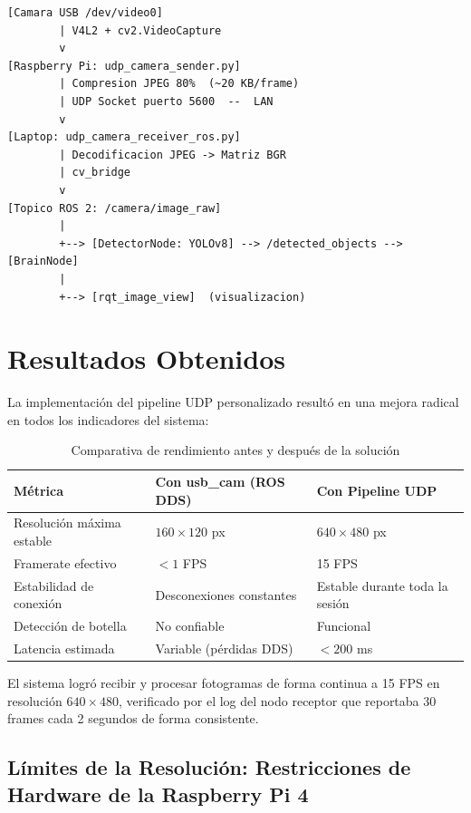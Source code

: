 \documentclass[12pt,a4paper]{article}
\begin{document}
\begin{verbatim}
[Camara USB /dev/video0]
        | V4L2 + cv2.VideoCapture
        v
[Raspberry Pi: udp_camera_sender.py]
        | Compresion JPEG 80%  (~20 KB/frame)
        | UDP Socket puerto 5600  --  LAN
        v
[Laptop: udp_camera_receiver_ros.py]
        | Decodificacion JPEG -> Matriz BGR
        | cv_bridge
        v
[Topico ROS 2: /camera/image_raw]
        |
        +--> [DetectorNode: YOLOv8] --> /detected_objects --> [BrainNode]
        |
        +--> [rqt_image_view]  (visualizacion)
\end{verbatim}

\section{Resultados Obtenidos}

La implementaci\'on del pipeline UDP personalizado result\'o en una mejora radical en todos los indicadores del sistema:

\begin{table}[H]
\centering
\begin{tabular}{lll}
\toprule
\textbf{M\'etrica} & \textbf{Con usb\_cam (ROS DDS)} & \textbf{Con Pipeline UDP} \\
\midrule
Resoluci\'on m\'axima estable & $160\times120$ px & $640\times480$ px \\
Framerate efectivo & $<1$ FPS & 15 FPS \\
Estabilidad de conexi\'on & Desconexiones constantes & Estable durante toda la sesi\'on \\
Detecci\'on de botella & No confiable & Funcional \\
Latencia estimada & Variable (p\'erdidas DDS) & $<200$ ms \\
\bottomrule
\end{tabular}
\caption{Comparativa de rendimiento antes y despu\'es de la soluci\'on}
\end{table}

El sistema logr\'o recibir y procesar fotogramas de forma continua a 15 FPS en resoluci\'on $640\times480$, verificado por el log del nodo receptor que reportaba 30 frames cada 2 segundos de forma consistente.

\subsection{L\'imites de la Resoluci\'on: Restricciones de Hardware de la Raspberry Pi 4}
\end{document}
